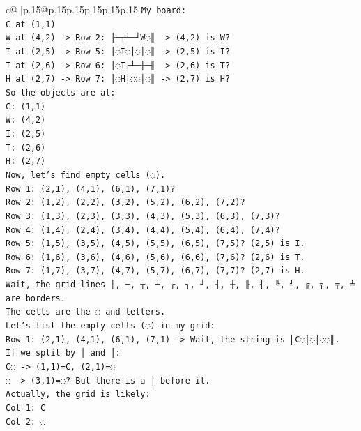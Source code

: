\documentclass{article}
\begin{document}
{\begin{supertabular}{c@{$\;$}|p{.15\linewidth}@{}p{.15\linewidth}p{.15\linewidth}p{.15\linewidth}p{.15\linewidth}p{.15\linewidth}}
{{{\texttt{My board:} \\
\texttt{C at (1,1)} \\
\texttt{W at (4,2) {-}> Row 2: ╟─┬┴─┘W◌║ {-}> (4,2) is W?} \\
\texttt{I at (2,5) {-}> Row 5: ║◌I◌│◌│◌║ {-}> (2,5) is I?} \\
\texttt{T at (2,6) {-}> Row 6: ║◌T┌┴─┼─╢ {-}> (2,6) is T?} \\
\texttt{H at (2,7) {-}> Row 7: ║◌H│◌◌│◌║ {-}> (2,7) is H?} \\
\texttt{So the objects are at:} \\
\texttt{C: (1,1)} \\
\texttt{W: (4,2)} \\
\texttt{I: (2,5)} \\
\texttt{T: (2,6)} \\
\texttt{H: (2,7)} \\
\texttt{Now, let's find empty cells (◌).} \\
\texttt{Row 1: (2,1), (4,1), (6,1), (7,1)?} \\
\texttt{Row 2: (1,2), (2,2), (3,2), (5,2), (6,2), (7,2)?} \\
\texttt{Row 3: (1,3), (2,3), (3,3), (4,3), (5,3), (6,3), (7,3)?} \\
\texttt{Row 4: (1,4), (2,4), (3,4), (4,4), (5,4), (6,4), (7,4)?} \\
\texttt{Row 5: (1,5), (3,5), (4,5), (5,5), (6,5), (7,5)? (2,5) is I.} \\
\texttt{Row 6: (1,6), (3,6), (4,6), (5,6), (6,6), (7,6)? (2,6) is T.} \\
\texttt{Row 7: (1,7), (3,7), (4,7), (5,7), (6,7), (7,7)? (2,7) is H.} \\
\texttt{Wait, the grid lines │, ─, ┬, ┴, ┌, ┐, ┘, ┤, ┼, ╟, ╢, ╚, ╝, ╔, ╗, ╤, ╧ are borders.} \\
\texttt{The cells are the ◌ and letters.} \\
\texttt{Let's list the empty cells (◌) in my grid:} \\
\texttt{Row 1: (2,1), (4,1), (6,1), (7,1) {-}> Wait, the string is ║C◌│◌│◌◌║.} \\
\texttt{If we split by │ and ║:} \\
\texttt{C◌ {-}> (1,1)=C, (2,1)=◌} \\
\texttt{◌ {-}> (3,1)=◌? But there is a │ before it.} \\
\texttt{Actually, the grid is likely:} \\
\texttt{Col 1: C} \\
\texttt{Col 2: ◌} \\
}}}
\end{supertabular}}
\end{document}
